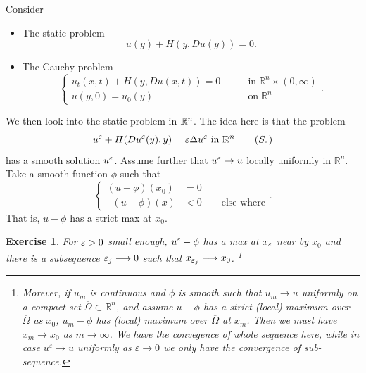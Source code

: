 \documentclass[12pt, oneside]{amsart}  	%
\newtheorem{exercise}{Exercise}
\begin{document}
Consider
\begin{itemize}
\item The static problem
\begin{equation}\label{S}
	u(y)+H(y,Du(y))=0 \tag{S}.
\end{equation}
\item The Cauchy problem
\begin{equation}\label{C}
\begin{cases}
u_t(x,t) + H(y,Du(x,t)) = 0 &\qquad\text{in}\;\mathbb{R}^n\times (0,\infty)\\
u(y,0)  = u_0(y) &\qquad\text{on}\;\mathbb{R}^n
\end{cases} \tag{$C$}.
\end{equation}
\end{itemize}



We then look into the static problem in $\mathbb{R}^n$. The idea here is that the problem
\begin{equation}\label{S_varepsilon}
	u^\varepsilon + H(Du^\varepsilon(y), y)=\varepsilon\Delta u^\varepsilon \text{ in } \mathbb{R}^n \tag{$S_\varepsilon$}
\end{equation}
has a smooth solution $u^\varepsilon$. Assume further that $u^\varepsilon \to u$ locally uniformly in $\mathbb{R}^n$. %
Take a smooth function $\phi$ such that %
\begin{equation*}
	\begin{cases}
		(u-\phi)(x_0)&=0\\
	\;\;	(u - \phi)(x) &< 0 \qquad\text{else where}
	\end{cases}.
\end{equation*}
That is, $u-\phi$ has a strict max at $x_0$.
\begin{exercise}\label{exercise1}
For $\varepsilon>0$ small enough, $u^\varepsilon -\phi$ has a max at $x_\varepsilon$ near by $x_0$ and there is a subsequence $\varepsilon_j\longrightarrow 0$ such that $x_{\varepsilon_j}\longrightarrow x_0$. \footnote{Morever, if  $u_m$ is continuous and $\phi$ is smooth such that $u_m \longrightarrow u$ uniformly on a compact set $\overline{\Omega}\subset\mathbb{R}^n$, and assume $u - \phi$ has a strict (local) maximum over $\overline{\Omega}$ as $x_0$, $u_m - \phi$ has (local) maximum over $\overline{\Omega}$ at $x_m$. Then we must have $x_m\longrightarrow  x_0$ as $m\longrightarrow\infty$. We have the convegence of whole sequence here, while in case $u^{\varepsilon}\longrightarrow u$ uniformly as $\varepsilon\longrightarrow 0$ we only have the convergence of sub-sequence.}
\end{exercise}
\end{document}
